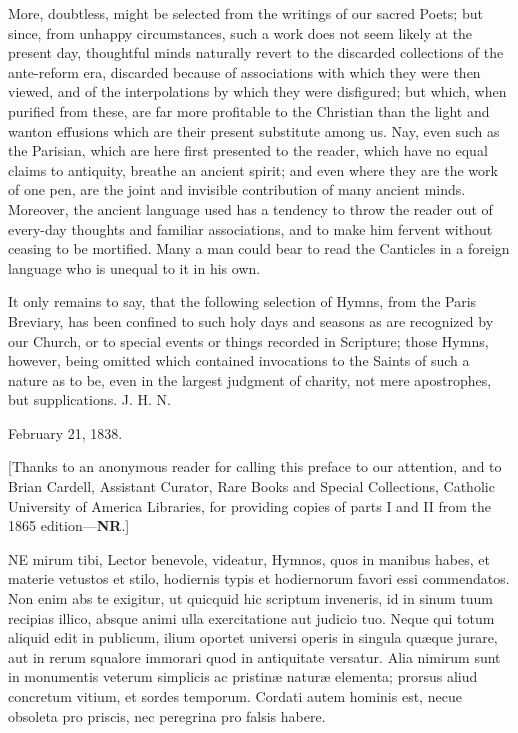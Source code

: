 More, doubtless, might be selected from the
writings of our sacred Poets; but since, from unhappy circumstances,
such a work does not seem likely at the present day, thoughtful minds
naturally revert to the discarded collections of the ante-reform era,
discarded because of associations with which they were then viewed,
and of the interpolations by which they were disfigured; but which,
when purified from these, are far more profitable to the Christian
than the light and wanton effusions which are their present substitute
among us. Nay, even such as the Parisian, which are here first
presented to the reader, which have no equal claims to antiquity,
breathe an ancient spirit; and even where they are the work of one
pen, are the joint and invisible contribution of many ancient minds.
Moreover, the ancient language used has a tendency to throw the reader
out of every-day thoughts and familiar associations, and to make him
fervent without ceasing to be mortified. Many a man could bear to read
the Canticles in a foreign language who is unequal to it in his own.

It only remains to say, that the following
selection of Hymns, from the Paris Breviary, has been confined to such
holy days and seasons as are recognized by our Church, or to
special events or things recorded in Scripture; those Hymns, however,
being omitted which contained invocations to the Saints of such a
nature as to be, even in the largest judgment of charity, not mere
apostrophes, but supplications.
J. H. N.

February 21, 1838.

[Thanks to an anonymous reader for calling this preface to our attention, and to Brian
Cardell, Assistant Curator, Rare Books and Special Collections,
Catholic University of America Libraries, for providing copies of
parts I and II from the 1865 edition—\textbf{NR}.]



NE mirum tibi, Lector benevole, videatur, Hymnos, quos in manibus
habes, et materie vetustos et stilo, hodiernis typis et hodiernorum
favori essi commendatos. Non enim abs te exigitur, ut quicquid hic
scriptum inveneris, id in sinum tuum recipias illico, absque animi
ulla exercitatione aut judicio tuo. Neque qui totum aliquid edit in
publicum, ilium oportet universi operis in singula quæque jurare, aut
in rerum squalore immorari quod in antiquitate versatur. Alia nimirum
sunt in monumentis veterum simplicis ac pristinæ naturæ elementa;
prorsus aliud concretum vitium, et sordes temporum. Cordati autem
hominis est, necue obsoleta pro priscis, nec peregrina pro falsis
habere.

